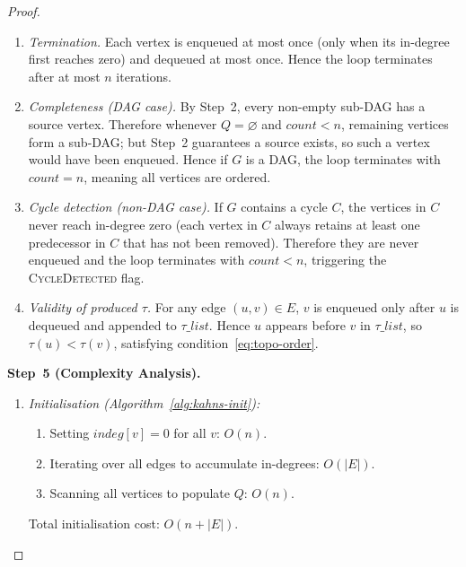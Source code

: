 \documentclass[12pt,openany]{book}
\numberwithin{equation}{chapter}
\theoremstyle{plain}
\theoremstyle{definition}
\theoremstyle{remark}
\numberwithin{equation}{chapter}
\theoremstyle{plain}
\begin{document}
\begin{proof}
\begin{enumerate}
        \emph{Maintenance:} When vertex $u$ is dequeued and appended,
        each out-neighbour $v$ of $u$ has its in-degree decremented.
        If $\mathit{indeg}[v]$ reaches zero, $v$ is enqueued.
        Invariant (a) holds for $u$ because $u$ was in $Q$ only after
        all its predecessors had been removed (by (b) and (c)).
        Invariants (b) and (c) are maintained by the decrement-and-enqueue
        logic.

  \item \emph{Termination.}
        Each vertex is enqueued at most once (only when its in-degree
        first reaches zero) and dequeued at most once.  Hence the loop
        terminates after at most $n$ iterations.

  \item \emph{Completeness (DAG case).}
        By Step~2, every non-empty sub-DAG has a source vertex.
        Therefore whenever $Q = \varnothing$ and $\mathit{count} < n$,
        remaining vertices form a sub-DAG; but Step~2 guarantees a
        source exists, so such a vertex would have been enqueued.
        Hence if $G$ is a DAG, the loop terminates with
        $\mathit{count} = n$, meaning all vertices are ordered.

  \item \emph{Cycle detection (non-DAG case).}
        If $G$ contains a cycle $C$, the vertices in $C$ never reach
        in-degree zero (each vertex in $C$ always retains at least one
        predecessor in $C$ that has not been removed).  Therefore they
        are never enqueued and the loop terminates with
        $\mathit{count} < n$, triggering the \textsc{CycleDetected}
        flag.

  \item \emph{Validity of produced $\tau$.}
        For any edge $(u, v) \in E$, $v$ is enqueued only after $u$ is
        dequeued and appended to $\tau\_list$.  Hence $u$ appears before
        $v$ in $\tau\_list$, so $\tau(u) < \tau(v)$, satisfying
        condition~\eqref{eq:topo-order}.
\end{enumerate}

\medskip
\noindent\textbf{Step~5 (Complexity Analysis).}

\begin{enumerate}
  \item \emph{Initialisation (Algorithm~\ref{alg:kahns-init}):}
        \begin{enumerate}
          \item Setting $\mathit{indeg}[v] = 0$ for all $v$: $O(n)$.
          \item Iterating over all edges to accumulate in-degrees:
                $O(|E|)$.
          \item Scanning all vertices to populate $Q$: $O(n)$.
        \end{enumerate}
        Total initialisation cost: $O(n + |E|)$.


\end{enumerate}
\end{proof}
\end{document}

